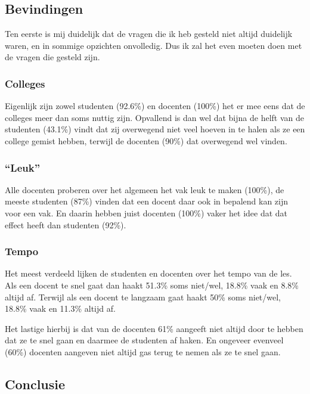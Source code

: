 \subsection{Bevindingen}
Ten eerste is mij duidelijk dat de vragen die ik heb gesteld niet altijd duidelijk waren, en in sommige opzichten onvolledig. Dus ik zal het even moeten doen met de vragen die gesteld zijn. 

\subsubsection{Colleges}
Eigenlijk zijn zowel studenten (92.6\%) en docenten (100\%) het er mee eens dat de colleges meer dan soms nuttig zijn. Opvallend is dan wel dat bijna de helft van de studenten (43.1\%) vindt dat zij overwegend niet veel hoeven in te halen als ze een college gemist hebben, terwijl de docenten (90\%) dat overwegend wel vinden.

\subsubsection{``Leuk''}
Alle docenten proberen over het algemeen het vak leuk te maken (100\%), de meeste studenten (87\%) vinden dat een docent daar ook in bepalend kan zijn voor een vak. En daarin hebben juist docenten (100\%) vaker het idee dat dat effect heeft dan studenten (92\%).

\subsubsection{Tempo}
Het meest verdeeld lijken de studenten en docenten over het tempo van de les. Als een docent te snel gaat dan haakt 51.3\% soms niet/wel, 18.8\% vaak en 8.8\% altijd af. Terwijl als een docent te langzaam gaat haakt 50\% soms niet/wel, 18.8\% vaak en 11.3\% altijd af.

Het lastige hierbij is dat van de docenten 61\% aangeeft niet altijd door te hebben dat ze te snel gaan en daarmee de studenten af haken. En ongeveer evenveel (60\%) docenten aangeven niet altijd gas terug te nemen als ze te snel gaan.


\subsection{Conclusie}
\cite{lalley2007learning}
